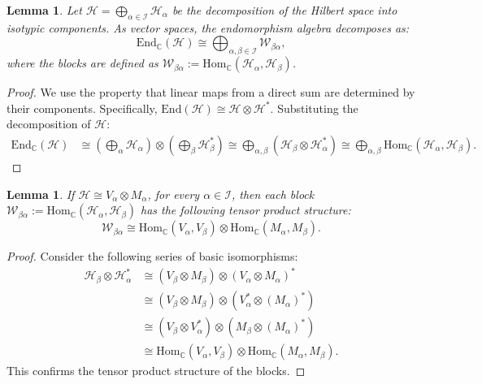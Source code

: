 \documentclass[10pt,twocolumn,superscriptaddress,aps,amsmath,amssymb,citeautoscript,floatfix,prx]{revtex4-2}
\newcounter{alg}
\theoremstyle{plain}
\theoremstyle{plain}
\theoremstyle{plain}
\theoremstyle{plain}
\theoremstyle{plain}
\theoremstyle{plain}
\newcommand{\End}{\mathrm{End}}
\newcommand{\Hom}{\mathrm{Hom}}
\newcommand{\HH}{\mathcal{H}}
\theoremstyle{plain}
\newtheorem{smlemma}[smtheorem]{Lemma}
\theoremstyle{definition}
\theoremstyle{plain}
\begin{document}
\begin{appendix}
\begin{smlemma}
    Let $\HH=\bigoplus_{\alpha\in \mathcal{I}} \mathcal{H}_\alpha$ be the decomposition of the Hilbert space into isotypic components. As vector spaces, the endomorphism algebra decomposes as:
    \begin{equation}\label{eq:endomorphism_decomposition}
        \End_{\mathbb{C}}(\mathcal{H}) \cong \bigoplus_{\alpha, \beta \in \mathcal{I}} \mathcal{W}_{\beta\alpha},
    \end{equation}
    where the blocks are defined as $\mathcal{W}_{\beta\alpha} := \Hom_{\mathbb{C}}(\mathcal{H}_\alpha, \mathcal{H}_\beta)$.
\end{smlemma}

\begin{proof}
    We use the property that linear maps from a direct sum are determined by their components. Specifically, $\End(\mathcal{H}) \cong \mathcal{H} \otimes \mathcal{H}^*$. Substituting the decomposition of $\mathcal{H}$:
    \begin{align*}
        \End_{\mathbb{C}}(\mathcal{H}) &\cong \left( \bigoplus_{\alpha} \mathcal{H}_\alpha \right) \otimes \left( \bigoplus_{\beta} \mathcal{H}_\beta^* \right) \cong \bigoplus_{\alpha, \beta} \left( \mathcal{H}_\beta \otimes \mathcal{H}_\alpha^* \right) \cong \bigoplus_{\alpha, \beta} \Hom_{\mathbb{C}}(\mathcal{H}_\alpha, \mathcal{H}_\beta).
    \end{align*}
\end{proof}

\begin{smlemma}
    If $\HH\cong V_\alpha \otimes M_\alpha$, for every $\alpha \in \mathcal{I}$, then each block $\mathcal{W}_{\beta\alpha}:=\Hom_{\mathbb{C}}(\mathcal{H}_\alpha, \mathcal{H}_\beta)$ has the following tensor product structure: 
    \begin{equation*}
        \mathcal{W}_{\beta\alpha} \cong \Hom_{\mathbb{C}}(V_\alpha, V_\beta) \otimes \Hom_{\mathbb{C}}(M_\alpha, M_\beta).
    \end{equation*}
\end{smlemma}

\begin{proof}
    Consider the following series of basic isomorphisms:
    \begin{align*}
        \mathcal{H}_\beta \otimes \mathcal{H}_\alpha^* &\cong (V_\beta \otimes M_{\beta}) \otimes (V_\alpha \otimes M_{\alpha})^* \\
        &\cong (V_\beta \otimes M_{\beta}) \otimes (V_\alpha^* \otimes (M_{\alpha})^*) \\
        &\cong (V_\beta \otimes V_\alpha^*) \otimes (M_{\beta} \otimes (M_{\alpha})^*) \\
        &\cong \Hom_{\mathbb{C}}(V_\alpha, V_\beta) \otimes \Hom_{\mathbb{C}}(M_\alpha, M_\beta).
    \end{align*}
    This confirms the tensor product structure of the blocks.
\end{proof}


\end{appendix}
\end{document}
